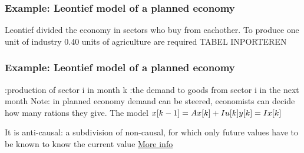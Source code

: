 \begin{frame}
	\frametitle{Example: Leontief model of a planned economy}
	Leontief divided the economy in sectors who buy from eachother.
	To produce one unit of industry 0.40 units of agriculture are required
	TABEL INPORTEREN
\end{frame}
\begin{frame}
	\frametitle{Example: Leontief model of a planned economy}
		     :production of sector i in month k
		     :the demand to goods from sector i in the next month
		     Note: in planned economy demand can be steered, economists can decide how many rations they give.
		     The model
		     $ x[k-1] = A x[k] + I u[k]\\
		     y[k] = I x[k]$
		     
		     It is anti-causal: a subdivision of non-causal, for which only future values have to be known to know the current value
		     \hyperlink{http://www.unc.edu/~marzuola/Math547_S13/Math547_S13_Projects/M_Kim_Section001_Leontief_IO_Model.pdf}{More info}
		     
\end{frame}


